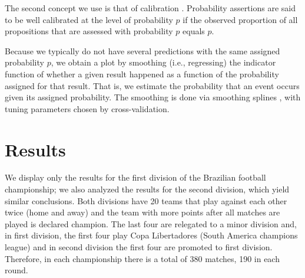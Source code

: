 \documentclass[journal,article,accept,moreauthors,pdftex,12pt,a4paper]{mdpi}
\begin{document}
    The second concept we use is that of calibration \cite{Dawid}. Probability assertions are said to be well calibrated at the level of probability $p$ if the observed proportion of all propositions that are assessed with probability $p$ equals $p$.

    Because we typically do not have several predictions with the same assigned probability $p$, we obtain a plot by smoothing (i.e., regressing) the indicator function of whether a given result happened as a function of the probability assigned for that result.
    That is, we estimate the probability that an event occurs given its assigned probability.
    The smoothing is done via smoothing splines \cite{wahba}, with tuning parameters chosen by cross-validation.




    \section{Results}
    \label{sec::results}

    We display only the results for the first division of the Brazilian football championship;
    we also analyzed the results for the second division, which yield similar conclusions.
    Both divisions have 20 teams that play against each other twice (home and away) and the team with more points after all matches are played is declared champion.
    The last four are relegated to a minor division and, in first division, the first four play Copa Libertadores (South America champions league) and in second division the first four are promoted to first division.
    Therefore, in each championship there is a total of 380 matches, 190 in each round.

\end{document}
